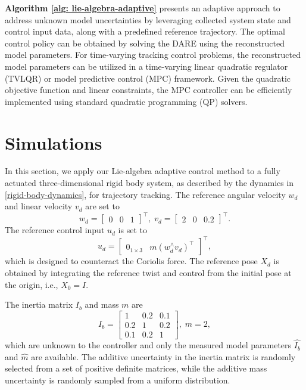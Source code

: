 \documentclass[lettersize,journal]{IEEEtran}
\begin{document}
\textbf{Algorithm \ref{alg: lie-algebra-adaptive}} presents an adaptive approach to address unknown model uncertainties by leveraging collected system state and control input data, along with a predefined reference trajectory. The optimal control policy can be obtained by solving the DARE using the reconstructed model parameters. For time-varying tracking control problems, the reconstructed model parameters can be utilized in a time-varying linear quadratic regulator (TVLQR) or model predictive control (MPC) framework. Given the quadratic objective function and linear constraints, the MPC controller can be efficiently implemented using standard quadratic programming (QP) solvers.

\section{Simulations}



In this section, we apply our Lie-algebra adaptive control method to a fully actuated three-dimensional rigid body system, as described by the dynamics in \eqref{rigid-body-dynamics}, for trajectory tracking. The reference angular velocity $w_d$
  and linear velocity $v_d$ are set to
  \begin{equation*}
      w_d = \begin{bmatrix}
    0 & 0 & 1
\end{bmatrix}^{\top}, \;
v_d = \begin{bmatrix}
    2 & 0 & 0.2
\end{bmatrix}^{\top}.
  \end{equation*}
The reference control input $u_d$ is set to
\begin{equation*}
    u_d = \begin{bmatrix}
    0_{1 \times 3} & m (w_d^{\wedge} v_d)^{\top} 
\end{bmatrix}^{\top},
\end{equation*}
which is designed to counteract the Coriolis force. 
The reference pose $X_d$ is obtained by integrating the reference twist and control from the initial pose at the origin, i.e., $X_0 = I$.

The inertia matrix $I_b$ and mass $m$ are
\begin{equation*}
    I_b = \begin{bmatrix}
        1 & 0.2 & 0.1\\
        0.2 & 1 & 0.2 \\
        0.1 & 0.2 & 1
    \end{bmatrix}, \; m = 2,
\end{equation*}
which are unknown to the controller and only the measured model parameters $\hat{I_b}$ and $\hat{m}$ are available. The additive uncertainty in the inertia matrix is randomly selected from a set of positive definite matrices, while the additive mass uncertainty is randomly sampled from a uniform distribution.
\end{document}
